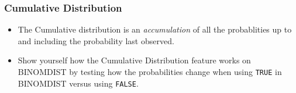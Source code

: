 \documentclass[12pt]{beamer}
\begin{document}
	\begin{frame}
		\frametitle{Cumulative Distribution}
		\begin{itemize}
			\item The Cumulative distribution is an \textit{accumulation} of all the probablities up to and including the probability last observed. 
			\bigskip
			\item Show yourself how the Cumulative Distribution feature works on BINOMDIST by testing how the probabilities change when using \texttt{TRUE} in BINOMDIST versus using \texttt{FALSE}. 
		\end{itemize}
	
	\end{frame}
\end{document}
